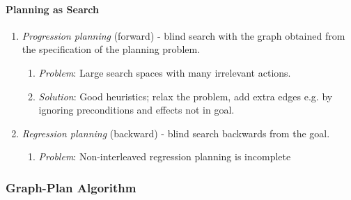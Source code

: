 \documentclass[twocolumn,english]{article}
\begin{document}
\paragraph{Planning as Search}
\begin{enumerate}
\item \emph{Progression planning} (forward) - blind search with the graph
obtained from the specification of the planning problem.
\begin{enumerate}
\item \emph{Problem}: Large search spaces with many irrelevant actions.
\item \emph{Solution}: Good heuristics; relax the problem, add extra edges
e.g. by ignoring preconditions and effects not in goal.
\end{enumerate}
\item \emph{Regression planning} (backward) - blind search backwards from
the goal.
\begin{enumerate}
\item \emph{Problem}: Non-interleaved regression planning is incomplete
\end{enumerate}
\end{enumerate}

\subsubsection*{Graph-Plan Algorithm}
\end{document}
